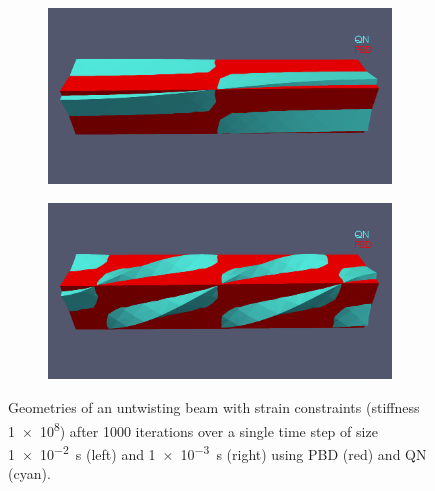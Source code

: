 \begin{figure}
    \begin{subfigure}{0.49\textwidth}
    \includegraphics[width=\textwidth, trim={0 5.0cm 0 2.5cm}, clip]{figures/strain_pbd_1e-2.png}
    \end{subfigure}
    \begin{subfigure}{0.49\textwidth}
    \includegraphics[width=\textwidth, trim={0 5.0cm 0 2.5cm}, clip]{figures/strain_pbd_1e-3.png}
    \end{subfigure}
    \caption{Geometries of an untwisting beam with strain constraints (stiffness \num{1e8}) after 1000 iterations over a single time step of size \SI{1e-2}{\second} (left) 
    and \SI{1e-3}{\second} (right) using PBD (red) and QN (cyan).}
    \label{fig:strain-pbd}
\end{figure}


